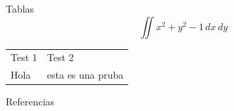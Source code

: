 \documentclass[9pt]{beamer}
\begin{document}
\begin{frame}[label={sec:orgf2dabc1}]{Tablas}
\[ \iint x^2 + y^2 - 1 \,dx \,dy \]
\begin{center}
\begin{tabular}{|l|l|}
Test 1 & Test 2\\
Hola & esta es una pruba\\
\end{tabular}

\end{center}
\end{frame}

\begin{frame}[label={sec:org6234747}]{Referencias}
\printbibliography[heading=none]
\end{frame}
\end{document}
